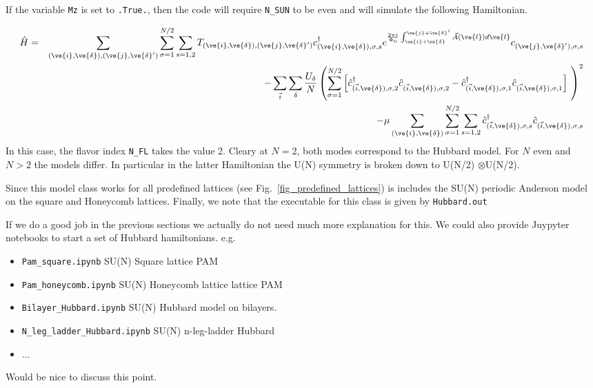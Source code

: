 If the variable \texttt{Mz} is set to \texttt{.True.}, then the code    will require  \texttt{N\_SUN}  to be even and will simulate the following Hamiltonian. 

\begin{eqnarray}
\hat{H}= & & \sum_{(\ve{i},\ve{\delta}), (\ve{j},\ve{\delta}')}  \sum_{\sigma =1}^{N/2}  \sum_{s=1,2} T_{(\ve{i},\ve{\delta}), (\ve{j},\ve{\delta}')}    c^{\dagger}_{(\ve{i},\ve{\delta}), \sigma,s }   e^{\frac{2 \pi i}{\Phi_0} \int_{\ve{i} + \ve{\delta}}^{\ve{j} + \ve{\delta}'}  
     \vec{A}(\ve{l})  d \ve{l}} c^{}_{(\ve{j},\ve{\delta}'),\sigma,s}     \nonumber   \\
    & & - \sum_{\vec{i}} \sum_{\delta}   \frac{U_\delta}{N} \left(\sum_{\sigma=1}^{N/2}  \left[   \hat{c}^{\dagger}_{(\vec{i},\ve{\delta}),\sigma, 2} 
    \hat{c}^{\phantom\dagger}_{(\vec{i}, \ve{\delta}),\sigma,2 }  -  \hat{c}^{\dagger}_{(\vec{i},\ve{\delta}),\sigma, 1} 
    \hat{c}^{\phantom\dagger}_{(\vec{i}, \ve{\delta}),\sigma,1} \right] \right)^2  \nonumber \\
    & & - \mu \sum_{(\ve{i},\ve{\delta})}  \sum_{\sigma =1}^{N/2}  \sum_{s=1,2}\hat{c}^{\dagger}_{(\vec{i},\ve{\delta}),\sigma, s} \hat{c}^{\phantom\dagger}_{(\vec{i},\ve{\delta}),\sigma, s} 
\end{eqnarray}
In this case, the flavor index \texttt{N\_FL}   takes the value 2. Cleary at $N=2$, both modes  correspond  to the Hubbard model.  For $N$  even and $N > 2$  the models differ.  In particular  in the latter  Hamiltonian the U(N) symmetry is broken down to  U(N/2) $\otimes $U(N/2).  

Since this model class  works for all predefined lattices  (see Fig.~\ref{fig_predefined_lattices})  is includes the SU(N) periodic Anderson model on   the square and Honeycomb lattices.     Finally,  we note that the executable for this class is given by \texttt{Hubbard.out}

{\color{red}  If we do a good job in the previous sections we actually do not need much more explanation for this.   We could also provide Juypyter notebooks to start a set of Hubbard  hamiltonians.  e.g.  
\begin{itemize}
\item   \texttt{Pam\_square.ipynb}            SU(N) Square lattice PAM 
\item  \texttt{Pam\_honeycomb.ipynb}     SU(N) Honeycomb lattice lattice PAM 
\item  \texttt{Bilayer\_Hubbard.ipynb}      SU(N) Hubbard model on bilayers.
\item  \texttt{N\_leg\_ladder\_Hubbard.ipynb}   SU(N) n-leg-ladder  Hubbard
\item ...
\end{itemize} 
Would be nice to discuss this point.}



